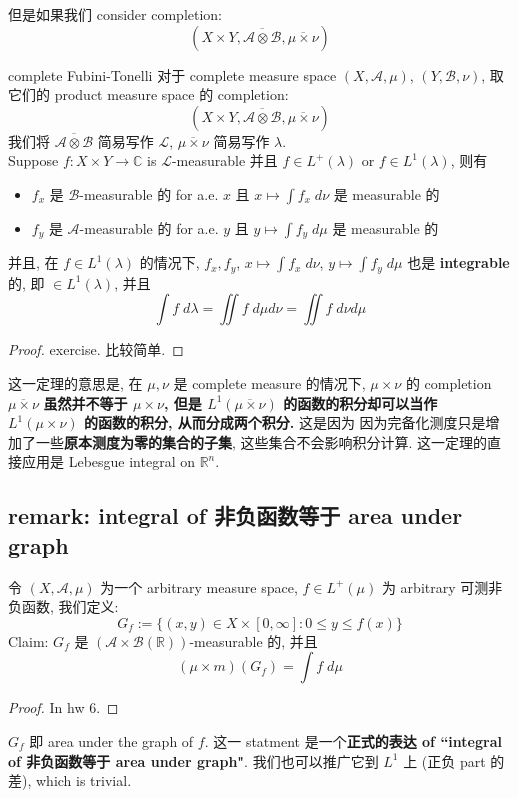 \documentclass[lang=cn,11pt]{elegantbook}
\begin{document}
但是如果我们 consider completion: \[
(X \times Y , \overline{\mathcal{A} \otimes \mathcal{B}},  \overline{\mu \times \nu}   ) 
\]
\begin{theorem}{complete Fubini-Tonelli}
对于 complete measure space \((X, \mathcal{A}, \mu)\), $ (Y , \mathcal{B}, \nu)$, 取它们的 product measure space 的 completion: \[
(X \times Y , \overline{\mathcal{A} \otimes \mathcal{B}},  \overline{\mu \times \nu}   ) 
\]
我们将 $\overline{\mathcal{A} \otimes \mathcal{B}}$ 简易写作 $\mathcal{L}$, $\overline{\mu \times \nu}   $ 简易写作 $\lambda$.\\
Suppose $f: X \times Y \to \mathbb{C}$ is $\mathcal{L}$-measurable 并且 $f \in L^+(\lambda)$ or $f \in L^1(\lambda)$, 则有
\begin{itemize}
    \item $f_x$ 是 $\mathcal{B}$-measurable 的 for a.e. $x$ 且 $x \mapsto \int f_x \; d\nu$ 是 measurable 的
    \item $f_y$ 是 $\mathcal{A}$-measurable 的 for a.e. $y$ 且 $y \mapsto \int f_y \; d\mu$ 是 measurable 的
\end{itemize}
并且, 在 $f \in L^1(\lambda)$ 的情况下,  $f_x, f_y$, $x \mapsto \int f_x \; d\nu$, $y \mapsto \int f_y \; d\mu$ 也是 \textbf{integrable} 的, 即 $\in L^1(\lambda)$, 并且 \[
\int f \; d\lambda = \iint  f \; d\mu d\nu =  \iint  f \; d\nu d\mu 
\]
\end{theorem}
\begin{proof}
    exercise. 比较简单.
\end{proof}
\begin{remark}
    这一定理的意思是, 在 $\mu,\nu$ 是 complete measure 的情况下, $\mu \times \nu$ 的 completion  $\overline{\mu \times \nu}   $ \textbf{虽然并不等于 $\mu \times \nu$, 但是 $ L^1(\overline{\mu \times \nu})$ 的函数的积分却可以当作 $ L^1(\mu \times \nu)$ 的函数的积分, 从而分成两个积分.}
    这是因为 因为完备化测度只是增加了一些\textbf{原本测度为零的集合的子集}, 这些集合不会影响积分计算. 这一定理的直接应用是 Lebesgue integral on $\mathbb{R}^n$.
\end{remark}

\subsection{remark: integral of 非负函数等于 area under graph}
\begin{theorem}
    令 $(X,\mathcal{A}, \mu)$ 为一个 arbitrary measure space, $f \in L^+(\mu)$ 为 arbitrary 可测非负函数, 我们定义: \[
    G_f := \{(x,y) \in X \times [0,\infty] : 0 \leq y \leq f(x)\}
    \]
    Claim: $G_f$ 是 $(\mathcal{A}\times \mathcal{B}(\mathbb{R}))$-measurable 的, 并且 \[
    (\mu \times m) (G_f) = \int f \; d\mu
    \]
\end{theorem}
\begin{proof}
    In hw 6.
\end{proof}
\begin{remark}
$G_f$ 即 area under the graph of $f$. 这一 statment 是一个\textbf{正式的表达 of ``integral of 非负函数等于 area under graph"}. 我们也可以推广它到 $L^1$ 上 (正负 part 的差), which is trivial.
\end{remark}
\end{document}
